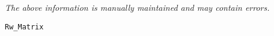 \label{pkg:rw\_matrix}

{\tiny \it The above information is manually maintained and may contain errors.}
\begin{verbatim}
Rw_Matrix
\end{verbatim}
